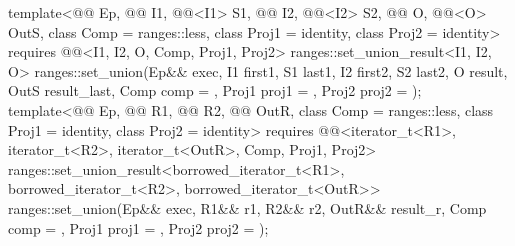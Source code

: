 \begin{itemdecl}
template<@@ Ep, @@ I1, @@<I1> S1,
         @@ I2, @@<I2> S2,
         @@ O, @@<O> OutS, class Comp = ranges::less,
         class Proj1 = identity, class Proj2 = identity>
  requires @@<I1, I2, O, Comp, Proj1, Proj2>
  ranges::set_union_result<I1, I2, O>
    ranges::set_union(Ep&& exec, I1 first1, S1 last1,
                      I2 first2, S2 last2, O result, OutS result_last,
                      Comp comp = {}, Proj1 proj1 = {}, Proj2 proj2 = {});
template<@@ Ep, @@ R1, @@ R2,
         @@ OutR, class Comp = ranges::less,
         class Proj1 = identity, class Proj2 = identity>
  requires @@<iterator_t<R1>, iterator_t<R2>, iterator_t<OutR>, Comp, Proj1, Proj2>
  ranges::set_union_result<borrowed_iterator_t<R1>, borrowed_iterator_t<R2>,
                           borrowed_iterator_t<OutR>>
    ranges::set_union(Ep&& exec, R1&& r1, R2&& r2, OutR&& result_r, Comp comp = {},
                      Proj1 proj1 = {}, Proj2 proj2 = {});
\end{itemdecl}

